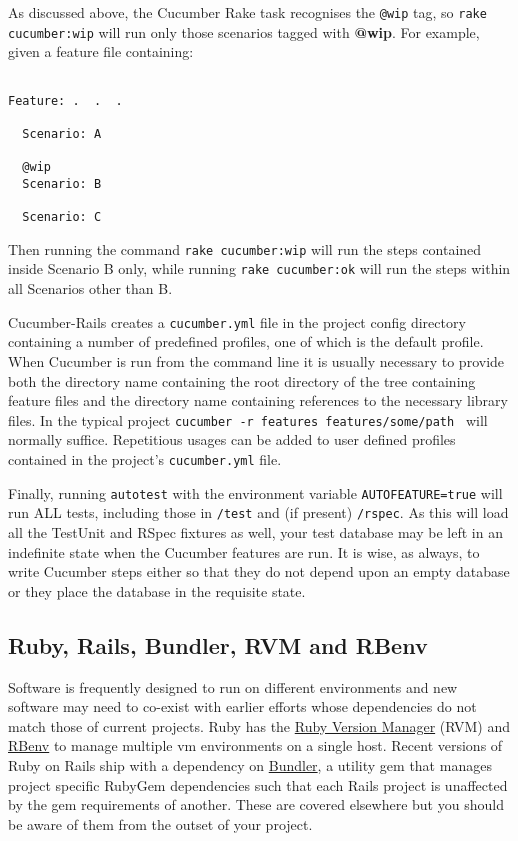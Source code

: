 As discussed above, the Cucumber Rake task recognises the \verb+@wip+ tag, so \verb+rake cucumber:wip+ will run only those scenarios tagged with \textbf{@wip}.  For example, given a feature file containing:

\begin{verbatim}

Feature: .  .  .

  Scenario: A

  @wip
  Scenario: B

  Scenario: C

\end{verbatim}
Then running the command \verb+rake cucumber:wip+ will run the steps contained inside Scenario B only, while running \verb+rake cucumber:ok+ will run the steps within all Scenarios other than B.

Cucumber-Rails creates a \verb+cucumber.yml+ file in the project config directory containing a number of predefined profiles, one of which is the default profile.  When Cucumber is run from the command line it is usually necessary to provide both the directory name containing the root directory of the tree containing feature files and the directory name containing references to the necessary library files.  In the typical project \verb+cucumber -r features features/some/path + will normally suffice.  Repetitious usages can be added to user defined profiles contained in the project's \verb+cucumber.yml+ file.

Finally, running \verb+autotest+ with the environment variable \verb+AUTOFEATURE=true+ will run ALL tests, including those in \verb+/test+ and (if present) \verb+/rspec+.  As this will load all the TestUnit and RSpec fixtures as well, your test database may be left in an indefinite state when the Cucumber features are run.  It is wise, as always, to write Cucumber steps either so that they do not depend upon an empty database or they place the database in the requisite state.

\subsection{Ruby, Rails, Bundler, RVM and RBenv}

Software is frequently designed to run on different environments and new software may need to co-exist with earlier efforts whose dependencies do not match those of current projects. Ruby has the \href{http://rvm.io/}{Ruby Version Manager} (RVM) and \href{https://github.com/sstephenson/rbenv.git}{RBenv} to manage multiple vm environments on a single host.  Recent versions of Ruby on Rails ship with a dependency on \href{http://gembundler.com/}{Bundler}, a utility gem that manages project specific RubyGem dependencies such that each Rails project is unaffected by the gem requirements of another.  These are covered elsewhere but you should be aware of them from the outset of your project.

